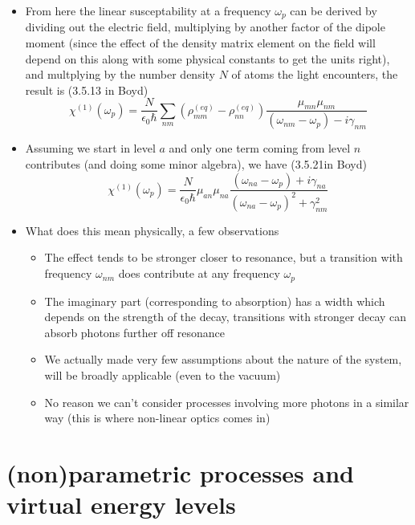 \documentclass[english]{article}
\begin{document}
\begin{itemize}
\begin{equation}
\end{equation}
\item From here the linear susceptability at a frequency $\omega_p$ can be derived by dividing out the electric field, multiplying by another factor of the dipole moment (since the effect of the density matrix element on the field will depend on this along with some physical constants to get the units right), and multplying by the number density $N$ of atoms the light encounters, the result is (3.5.13 in Boyd) 
\begin{equation}
\chi^{(1)}(\omega_p)=\frac{N}{\epsilon_0\hbar}\sum_{nm}(\rho^{(eq)}_{mm}-\rho^{(eq)}_{nn})\frac{\mu_{mn}\mu_{nm}}{(\omega_{nm}-\omega_p)-i \gamma_{nm}} \label{eq:full_first_order_suscept}
\end{equation}
\item Assuming we start in level $a$ and only one term coming from level $n$ contributes (and doing some minor algebra), we have (3.5.21in Boyd)
\begin{equation}
\chi^{(1)}(\omega_p)=\frac{N}{\epsilon_0\hbar}\mu_{an}\mu_{na}\frac{(\omega_{na}-\omega_p)+i \gamma_{na}}{(\omega_{na}-\omega_p)^2+\gamma^2_{nm}} \label{eq:suscept_2lvl}
\end{equation}
\item What does this mean physically, a few observations 
\begin{itemize}
\item The effect tends to be stronger closer to resonance, but a transition with frequency $\omega_{nm}$ does contribute at any frequency $\omega_p$
\item The imaginary part (corresponding to absorption) has a width which depends on the strength of the decay, transitions with stronger decay can absorb photons further off resonance
\item We actually made very few assumptions about the nature of the system, will be broadly applicable (even to the vacuum)
\item No reason we can't consider processes involving more photons in a similar way (this is where non-linear optics comes in)
\end{itemize}
\end{itemize}

\section{(non)parametric processes and virtual energy levels}
\end{document}
